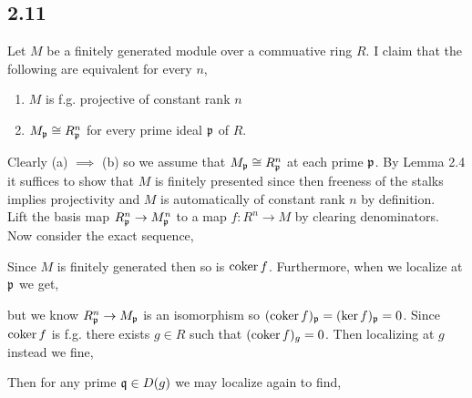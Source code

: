 \documentclass[12pt]{extarticle}
\begin{document}
\subsection{2.11}

Let $M$ be a finitely generated module over a commuative ring $R$. I claim that the following are equivalent for every $n$,
\begin{enumerate}
\item $M$ is f.g. projective of constant rank $n$
\item $M_{\mathfrak{p}} \cong R^n_{\mathfrak{p}}$ for every prime ideal $\mathfrak{p}$ of $R$.
\end{enumerate}
Clearly (a) $\implies$ (b) so we assume that $M_{\mathfrak{p}} \cong R^n_{\mathfrak{p}}$ at each prime $\mathfrak{p}$. By Lemma 2.4 it suffices to show that $M$ is finitely presented since then freeness of the stalks implies projectivity and $M$ is automatically of constant rank $n$ by definition. 
\bigskip\\
Lift the basis map $R_{\mathfrak{p}}^n \to M_{\mathfrak{p}}^n$ to a map $f : R^n \to M$ by clearing denominators. Now consider the exact sequence,
\begin{center}
\end{center}
Since $M$ is finitely generated then so is $\operatorname{\mathrm{coker}}{f}$. Furthermore, when we localize at $\mathfrak{p}$ we get,
\begin{center}
\end{center}
but we know $R^n_{\mathfrak{p}} \to M_{\mathfrak{p}}$ is an isomorphism so $(\operatorname{\mathrm{coker}}{f})_{\mathfrak{p}} = (\ker{f})_{\mathfrak{p}} = 0$. Since $\operatorname{\mathrm{coker}}{f}$ is f.g. there exists $g \in R$ such that $(\operatorname{\mathrm{coker}}{f})_g = 0$. Then localizing at $g$ instead we fine,
\begin{center}
\end{center}
Then for any prime $\mathfrak{q} \in D(g)$ we may localize again to find,
\begin{center}
\end{center}
\end{document}
